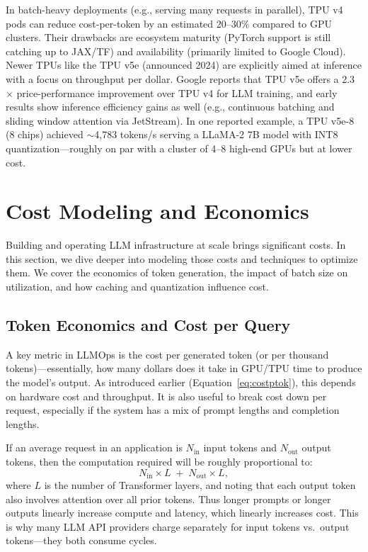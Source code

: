 In batch-heavy deployments (e.g., serving many requests in parallel), TPU v4 pods can reduce cost-per-token by an estimated 20–30\% compared to GPU clusters. Their drawbacks are ecosystem maturity (PyTorch support is still catching up to JAX/TF) and availability (primarily limited to Google Cloud). Newer TPUs like the TPU v5e (announced 2024) are explicitly aimed at inference with a focus on throughput per dollar. Google reports that TPU v5e offers a 2.3$\times$ price-performance improvement over TPU v4 for LLM training, and early results show inference efficiency gains as well (e.g., continuous batching and sliding window attention via JetStream). In one reported example, a TPU v5e-8 (8 chips) achieved $\sim$4{,}783 tokens/s serving a LLaMA-2 7B model with INT8 quantization—roughly on par with a cluster of 4–8 high-end GPUs but at lower cost.

\section{Cost Modeling and Economics}
\label{sec:infra-cost}

Building and operating LLM infrastructure at scale brings significant costs. In this section, we dive deeper into modeling those costs and techniques to optimize them. We cover the economics of token generation, the impact of batch size on utilization, and how caching and quantization influence cost.

\subsection{Token Economics and Cost per Query}
\label{sec:infra-cost-tokens}

A key metric in LLMOps is the cost per generated token (or per thousand tokens)---essentially, how many dollars does it take in GPU/TPU time to produce the model’s output. As introduced earlier (Equation~\ref{eq:costptok}), this depends on hardware cost and throughput. It is also useful to break cost down per request, especially if the system has a mix of prompt lengths and completion lengths. 

If an average request in an application is $N_{\text{in}}$ input tokens and $N_{\text{out}}$ output tokens, then the computation required will be roughly proportional to:
\[
N_{\text{in}} \times L \; + \; N_{\text{out}} \times L , \label{eq:costptok}
\]
where $L$ is the number of Transformer layers, and noting that each output token also involves attention over all prior tokens. Thus longer prompts or longer outputs linearly increase compute and latency, which linearly increases cost. This is why many LLM API providers charge separately for input tokens vs.\ output tokens—they both consume cycles.

